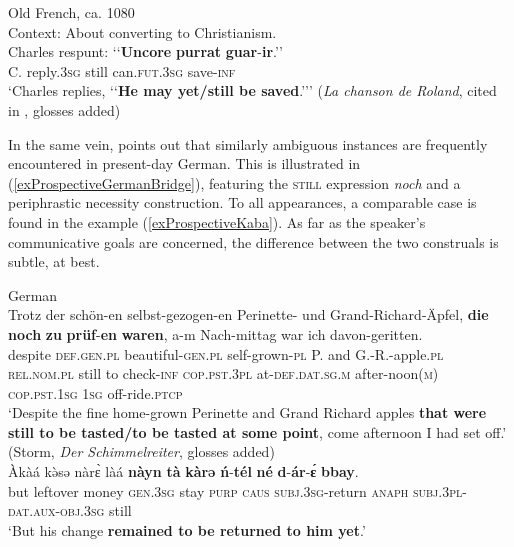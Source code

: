 \begin{exe}
		\ex Old French, ca. 1080\label{exProspectiveOldFrench2}\\
		Context: About converting to Christianism.\\
		\gll Charles respunt: \lq\lq{}\textbf{Uncore} \textbf{purrat} \textbf{guar}-\textbf{ir}.\rq\rq\\
		C. reply.3\textsc{sg} \phantom{\lq\lq}still can.\textsc{fut}.3\textsc{sg} save-\textsc{inf}\\
		\glt \lq Charles replies, \lq\lq \textbf{He may yet}\textbf{/still be saved}.{\rq\rq}\rq{ }(\textit{La chanson de Roland}, cited in \cite[146 fn 12]{MosegaardHansen2008}, glosses added)
\end{exe} 

In the same vein, \textcite{Shetter1966} points out that similarly ambiguous instances are frequently encountered in present-day German. This is illustrated in (\ref{exProspectiveGermanBridge}), featuring the \textsc{still} expression \textit{noch} and a periphrastic necessity construction. To all appearances, a comparable case is found in the  example (\ref{exProspectiveKaba}). As far as the speaker's communicative goals are concerned, the difference between the two construals is subtle, at best.

\begin{exe}
	\ex German \label{exProspectiveGermanBridge}\\
	\gll Trotz der schön-en selbst-gezogen-en Perinette- und Grand-Richard-Äpfel, \textbf{die} \textbf{noch} \textbf{zu} \textbf{prüf}-\textbf{en} \textbf{waren}, a-m Nach-mittag war ich davon-geritten.\\
	despite \textsc{def}.\textsc{gen}.\textsc{pl} beautiful-\textsc{gen}.\textsc{pl} self-grown-\textsc{pl} P. and G.-R.-apple.\textsc{pl} \textsc{rel}.\textsc{nom}.\textsc{pl} still to check-\textsc{inf} \textsc{cop}.\textsc{pst}.3\textsc{pl} at-\textsc{def}.\textsc{dat}.\textsc{sg}.\textsc{m} after-noon(\textsc{m}) \textsc{cop}.\textsc{pst}.1\textsc{sg} 1\textsc{sg} off-ride.\textsc{ptcp}\\
	\glt \lq Despite the fine home-grown Perinette and Grand Richard apples \textbf{that were still to be tasted/to be tasted at some point}, come afternoon I had set off.' (Storm, \textit{Der Schimmelreiter},  glosses added)
	\ex {}\label{exProspectiveKaba}\\
	\gll Àkàá kə̀sə nàrɛ̀ làá \textbf{nàyn} \textbf{tà} \textbf{kàrə} \textbf{ń}-\textbf{tél} \textbf{né} \textbf{d}-\textbf{ár}-\textbf{ɛ́} \textbf{bbay}.\\
	but leftover money \textsc{gen}.3\textsc{sg} stay \textsc{purp} \textsc{caus} \textsc{subj}.3\textsc{sg}-return \textsc{anaph} \textsc{subj}.3\textsc{pl}-\textsc{dat}.\textsc{aux}-\textsc{obj}.3\textsc{sg} still\\
	\glt \lq But his change \textbf{remained to be returned to him yet}.' \parencite[356]{Moser2004}
\end{exe}

